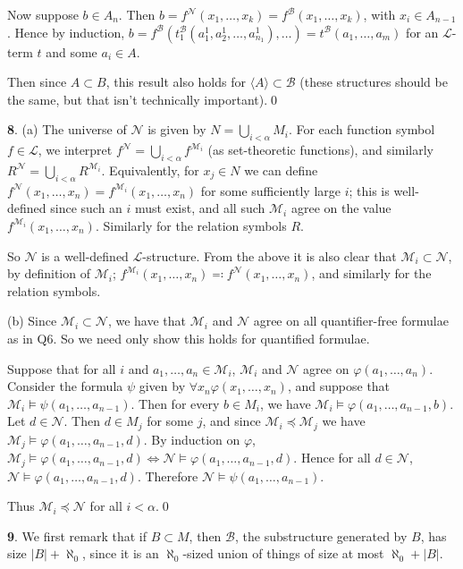 \documentclass[]{article}
\theoremstyle{custhm}
\theoremstyle{cusdef}
\theoremstyle{custhm}
\theoremstyle{custhm}
\theoremstyle{custhm}
\theoremstyle{custhm}
\theoremstyle{cusdef}
\theoremstyle{remark}
\newcommand{\N}{\mathcal{N}}
\renewcommand{\L}{\mathcal{L}}
\newcommand{\M}{\mathcal{M}}
\renewcommand{\phi}{\varphi}
\begin{document}
Now suppose $b\in A_{n}$. Then $b = f^\N(x_1,\dots,x_k) = f^\mathcal{B}(x_1,\dots,x_k)$, with $x_i\in A_{n-1}$. Hence by induction, $b = f^\mathcal{B}(t_1^\mathcal{B}(a_1^1,a_2^1,\dots,a_{n_1}^1),\dots) = t^\mathcal{B}(a_1,\dots,a_m)$ for an $\L$-term $t$ and some $a_i\in A$.

Then since $A\subset B$, this result also holds for $\langle A\rangle \subset \mathcal{B}$ (these structures should be the same, but that isn't technically important).\qed

\textbf{8}. (a) The universe of $\N$ is given by $N = \bigcup_{i < \alpha} M_i$. For each function symbol $f\in \L$, we interpret $f^\N = \bigcup_{i < \alpha}f^{\M_i}$ (as set-theoretic functions), and similarly $R^{\N} = \bigcup_{i < \alpha}R^{\M_i}$. Equivalently, for $x_j \in N$ we can define $f^{\N}(x_1,\dots,x_n) = f^{\M_i}(x_1,\dots,x_n)$ for some sufficiently large $i$; this is well-defined since such an $i$ must exist, and all such $\M_i$ agree on the value $f^{\M_i}(x_1,\dots,x_n)$. Similarly for the relation symbols $R$.

So $\N$ is a well-defined $\L$-structure. From the above it is also clear that $\M_i\subset \N$, by definition of $\M_i$; $f^{\M_i}(x_1,\dots,x_n)\eqqcolon f^\N(x_1,\dots,x_n)$, and similarly for the relation symbols.

(b) Since $\M_i\subset \N$, we have that $\M_i$ and $\N$ agree on all quantifier-free formulae as in Q6. So we need only show this holds for quantified formulae.

Suppose that for all $i$ and $a_1,\dots,a_n\in \M_i$, $\M_i$ and $\N$ agree on $\phi(a_1,\dots,a_n)$. Consider the formula $\psi$ given by $\forall x_n \phi(x_1,\dots,x_n)$, and suppose that $\M_i \models \psi(a_1,\dots,a_{n-1})$. Then for every $b\in M_i$, we have $\M_i\models \phi(a_1,\dots,a_{n-1},b)$. Let $d\in \N$. Then $d\in M_j$ for some $j$, and since $\M_i\preceq \M_j$ we have $\M_j \models \phi(a_1,\dots,a_{n-1},d)$. By induction on $\phi$, $\M_j\models \phi(a_1,\dots,a_{n-1},d) \iff \N \models \phi(a_1,\dots,a_{n-1},d)$. Hence for all $d\in \N$, $\N\models \phi(a_1,\dots,a_{n-1},d)$. Therefore $\N\models \psi(a_1,\dots,a_{n-1})$.

Thus $\M_i \preceq \N$ for all $i < \alpha$.\qed

\textbf{9}. We first remark that if $B\subset M$, then $\mathcal{B}$, the substructure generated by $B$, has size $|B| + \aleph_0$, since it is an $\aleph_0$-sized union of things of size at most $\aleph_0 + |B|$.
\end{document}
